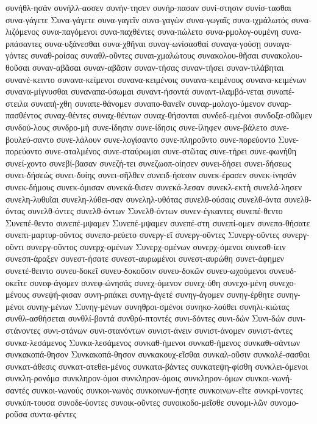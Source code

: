 {συνήθλ-ησάν
συνήλλ-ασσεν
συνήν-τησεν
συνήρ-πασαν
συνί-στησιν
συνίσ-τασθαι
συνα-γάγετε
Συνα-γάγετε
συνα-γαγεῖν
συνα-γαγὼν
συνα-γωγαῖς
συνα-ιχμάλωτός
συνα-λιζόμενος
συνα-παγόμενοι
συνα-παχθέντες
συνα-πώλετο
συνα-ρμολογ-ουμένη
συνα-ρπάσαντες
συνα-υξάνεσθαι
συνα-χθῆναι
συναγ-ωνίσασθαί
συναγα-γούσῃ
συναγα-γόντες
συναθ-ροίσας
συναθλ-οῦντες
συναι-χμαλώτους
συνακολου-θῆσαι
συνακολου-θοῦσαι
συναν-αβᾶσαι
συναν-αβᾶσιν
συναν-τήσας
συναν-τήσει
συναν-τιλάβηται
συνανέ-κειντο
συνανα-κείμενοι
συνανα-κειμένοις
συνανα-κειμένους
συνανα-κειμένων
συνανα-μίγνυσθαι
συναναπα-ύσωμαι
συναντ-ήσοντά
συναντ-ιλαμβά-νεται
συναπέ-στειλα
συναπή-χθη
συναπε-θάνομεν
συναπο-θανεῖν
συναρ-μολογο-ύμενον
συναρ-πασθέντος
συναχ-θέντες
συναχ-θέντων
συναχ-θήσονται
συνδεδ-εμένοι
συνδοξα-σθῶμεν
συνδού-λους
συνδρο-μὴ
συνε-ίδησιν
συνε-ίδησις
συνε-ίληφεν
συνε-βάλετο
συνε-βουλεύ-σαντο
συνε-λάλουν
συνε-λογίσαντο
συνε-πληροῦντο
συνε-πορεύοντο
Συνε-πορεύοντο
συνε-σταλμένος
συνε-σταύρωμαι
συνε-στῶτας
συνε-τήρει
συνε-φωνήθη
συνεί-χοντο
συνεβί-βασαν
συνεζή-τει
συνεζωοπ-οίησεν
συνει-δήσει
συνει-δήσεως
συνει-δήσεώς
συνει-δυίης
συνει-σῆλθεν
συνειδ-ήσεσιν
συνεκ-έρασεν
συνεκ-ίνησάν
συνεκ-δήμους
συνεκ-όμισαν
συνεκά-θισεν
συνεκά-λεσαν
συνεκλ-εκτὴ
συνελά-λησεν
συνελη-λυθυῖαι
συνελη-λύθει-σαν
συνεληλ-υθότας
συνελθ-ούσαις
συνελθ-όντα
συνελθ-όντας
συνελθ-όντες
συνελθ-όντων
Συνελθ-όντων
συνεν-έγκαντες
συνεπέ-θεντο
Συνεπέ-θεντο
συνεπέ-μψαμεν
Συνεπέ-μψαμεν
συνεπέ-στη
συνεπί-ομεν
συνεπα-θήσατε
συνεπι-μαρτυρ-οῦντος
συνεπο-ρεύετο
συνεργ-εῖ
συνεργ-οῦντες
Συνεργ-οῦντες
συνεργ-οῦντι
συνεργ-οῦντος
συνερχ-ομένων
Συνερχ-ομένων
συνερχ-όμενοι
συνεσθ-ίειν
συνεσπ-άραξεν
συνεστ-ήσατε
συνεστ-αυρωμένοι
συνεστ-αυρώθη
συνετ-άφημεν
συνετέ-θειντο
συνευ-δοκεῖ
συνευ-δοκοῦσιν
συνευ-δοκῶν
συνευ-ωχούμενοι
συνευδ-οκεῖτε
συνεφ-άγομεν
συνεφ-ώνησάς
συνεχ-όμενον
συνεχ-ύθη
συνεχο-μένη
συνεχο-μένους
συνεψή-φισαν
συνη-ρπάκει
συνηγ-άγετέ
συνηγ-άγομεν
συνηγ-έρθητε
συνηγ-μένοι
συνηγ-μένων
Συνηγ-μένων
συνηθροι-σμένοι
συνηκο-λούθει
συνηλι-κιώτας
συνθλ-ασθήσεται
συνθλί-βοντά
συνθρύ-πτοντές
συνι-δόντες
συνι-δών
Συνι-δών
συνι-στάνοντες
συνι-στάνων
συνι-στανόντων
συνιστ-άνειν
συνιστ-άνομεν
συνιστ-άντες
συνκα-λεσάμενος
Συνκα-λεσάμενος
συνκαθ-ήμενοι
συνκαθ-ήμενος
συνκαθι-σάντων
συνκακοπά-θησον
Συνκακοπά-θησον
συνκακουχ-εῖσθαι
συνκαλ-οῦσιν
συνκαλέ-σασθαι
συνκατ-άθεσις
συνκατ-ατεθει-μένος
συνκατα-βάντες
συνκατεψη-φίσθη
συνκλει-όμενοι
συνκλη-ρονόμα
συνκληρον-όμοι
συνκληρον-όμοις
συνκληρον-όμων
συνκοι-νωνή-σαντές
συνκοι-νωνούς
συνκοι-νωνὸς
συνκοινων-ήσητε
συνκοινων-εῖτε
συνκρί-νοντες
συνκύπ-τουσα
συνοδε-ύοντες
συνοικ-οῦντες
συνοικοδο-μεῖσθε
συνομι-λῶν
συνομο-ροῦσα
συντα-φέντες
}
